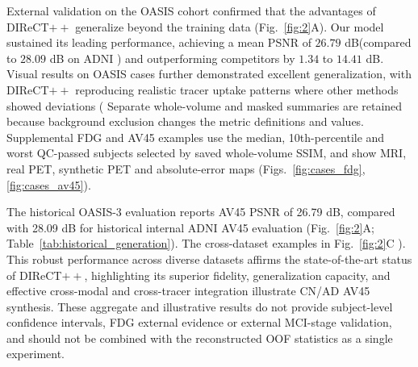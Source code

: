 \documentclass{article}
\providecommand{\DIFaddtex}[1]{{\protect\color{blue} \sf #1}} %
\providecommand{\DIFdeltex}[1]{{\protect\color{red} \scriptsize #1}} %
\providecommand{\DIFaddbegin}{} %
\providecommand{\DIFaddend}{} %
\providecommand{\DIFdelbegin}{} %
\providecommand{\DIFdelend}{} %
\providecommand{\DIFadd}[1]{\texorpdfstring{\DIFaddtex{#1}}{#1}} %
\providecommand{\DIFdel}[1]{\texorpdfstring{\DIFdeltex{#1}}{}} %
\newcommand{\DIFscaledelfig}{0.5}
\newlength{\DIFdelgraphicswidth} %
\newlength{\DIFdelgraphicsheight} %
\newcommand{\DIFaddincludegraphics}[2][]{{\color{blue}\fbox{\DIFOincludegraphics[#1]{#2}}}} %
\newcommand{\DIFdelincludegraphics}[2][]{%
\sbox{\DIFdelgraphicsbox}{\DIFOincludegraphics[#1]{#2}}%
\settoboxwidth{\DIFdelgraphicswidth}{\DIFdelgraphicsbox} %
\settoboxtotalheight{\DIFdelgraphicsheight}{\DIFdelgraphicsbox} %
\scalebox{\DIFscaledelfig}{%
\parbox[b]{\DIFdelgraphicswidth}{\usebox{\DIFdelgraphicsbox}\\[-\baselineskip] \rule{\DIFdelgraphicswidth}{0em}}\llap{\resizebox{\DIFdelgraphicswidth}{\DIFdelgraphicsheight}{%
\setlength{\unitlength}{\DIFdelgraphicswidth}%
\begin{picture}(1,1)%
\thicklines\linethickness{2pt} %
{\color[rgb]{1,0,0}\put(0,0){\framebox(1,1){}}}%
{\color[rgb]{1,0,0}\put(0,0){\line( 1,1){1}}}%
{\color[rgb]{1,0,0}\put(0,1){\line(1,-1){1}}}%
\end{picture}%
}\hspace*{3pt}}} %
} %
\DeclareRobustCommand{\DIFaddbegin}{\DIFOaddbegin \let\includegraphics\DIFaddincludegraphics} %
\DeclareRobustCommand{\DIFaddend}{\DIFOaddend \let\includegraphics\DIFOincludegraphics} %
\DeclareRobustCommand{\DIFdelbegin}{\DIFOdelbegin \let\includegraphics\DIFdelincludegraphics} %
\DeclareRobustCommand{\DIFdelend}{\DIFOaddend \let\includegraphics\DIFOincludegraphics} %
\begin{document}
\DIFdelbegin \DIFdel{External validation on the OASIS cohort confirmed that the advantages of DIReCT$++$ generalize beyond the training data (Fig.~\ref{fig:2}A).
Our model sustained its leading performance, achieving a mean PSNR of $26.79$ dB(compared to $28.09$ dB on ADNI ) and outperforming competitors by $1.34$ to $14.41$ dB. Visual results on OASIS cases further demonstrated excellent generalization, with DIReCT$++$ reproducing realistic tracer uptake patterns where other methods showed deviations (}\DIFdelend \DIFaddbegin \DIFadd{Separate whole-volume and masked summaries are retained because background exclusion changes the metric definitions and values. Supplemental FDG and AV45 examples use the median, 10th-percentile and worst QC-passed subjects selected by saved whole-volume SSIM, and show MRI, real PET, synthetic PET and absolute-error maps (Figs.~\ref{fig:cases_fdg},\ref{fig:cases_av45}).
}

\DIFadd{The historical OASIS-3 evaluation reports AV45 PSNR of 26.79 dB, compared with 28.09 dB for historical internal ADNI AV45 evaluation (Fig.~\ref{fig:2}A; Table~\ref{tab:historical_generation}). The cross-dataset examples in }\DIFaddend Fig.~\ref{fig:2}C \DIFdelbegin \DIFdel{). This robust performance across diverse datasets affirms the state-of-the-art status of DIReCT$++$, highlighting its superior fidelity, generalization capacity, and effective cross-modal and cross-tracer integration}\DIFdelend \DIFaddbegin \DIFadd{illustrate CN/AD AV45 synthesis. These aggregate and illustrative results do not provide subject-level confidence intervals, FDG external evidence or external MCI-stage validation, and should not be combined with the reconstructed OOF statistics as a single experiment}\DIFaddend .
\end{document}
